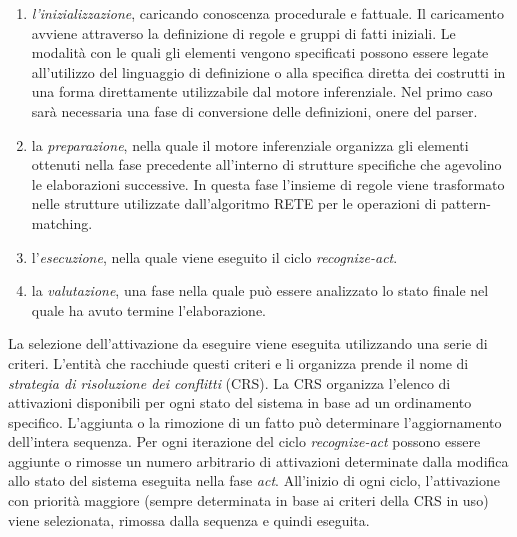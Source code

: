 \begin{enumerate}
	\item \emph{l'inizializzazione}, caricando conoscenza procedurale e fattuale. Il caricamento avviene attraverso la definizione di regole e gruppi di fatti iniziali. Le modalità con le quali gli elementi vengono specificati possono essere legate all'utilizzo del linguaggio di definizione o alla specifica diretta dei costrutti in una forma direttamente utilizzabile dal motore inferenziale. Nel primo caso sarà necessaria una fase di conversione delle definizioni, onere del parser.
	\item la \emph{preparazione}, nella quale il motore inferenziale organizza gli elementi ottenuti nella fase precedente all'interno di strutture specifiche che agevolino le elaborazioni successive. In questa fase l'insieme di regole viene trasformato nelle strutture utilizzate dall'algoritmo RETE per le operazioni di pattern-matching.
	\item l'\emph{esecuzione}, nella quale viene eseguito il ciclo \emph{recognize-act}.
	\item la \emph{valutazione}, una fase nella quale può essere analizzato lo stato finale nel quale ha avuto termine l'elaborazione.
\end{enumerate}

La selezione dell'attivazione da eseguire viene eseguita utilizzando una serie di criteri. L'entità che racchiude questi criteri e li organizza prende il nome di \emph{strategia di risoluzione dei conflitti} (CRS). La CRS organizza l'elenco di attivazioni disponibili per ogni stato del sistema in base ad un ordinamento specifico. L'aggiunta o la rimozione di un fatto può determinare l'aggiornamento dell'intera sequenza. Per ogni iterazione del ciclo \emph{recognize-act} possono essere aggiunte o rimosse un numero arbitrario di attivazioni determinate dalla modifica allo stato del sistema eseguita nella fase \emph{act}. All'inizio di ogni ciclo, l'attivazione con priorità maggiore (sempre determinata in base ai criteri della CRS in uso) viene selezionata, rimossa dalla sequenza e quindi eseguita.

